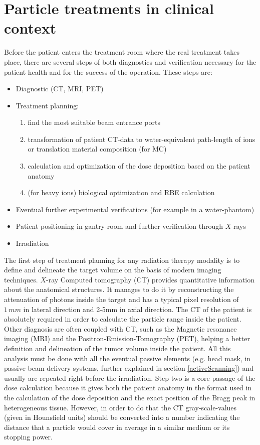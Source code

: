 \documentclass[12pt, a4paper, twoside]{book}
\begin{document}

\section{Particle treatments in clinical context}
Before the patient enters the treatment room where the real treatment takes place, there are several steps of both diagnostics and verification necessary for the patient health and for the success of the operation.
These steps are:
\begin{itemize}
\item Diagnostic (CT, MRI, PET)
\item Treatment planning:
	\begin{enumerate}
	\item find the most suitable beam entrance ports
	\item transformation of patient CT-data to water-equivalent path-length of ions or translation material composition (for MC)
	\item calculation and optimization of the dose deposition based on the patient anatomy
	\item (for heavy ions) biological optimization and RBE calculation
	\end{enumerate}
\item Eventual further experimental verifications (for example in a water-phantom)
\item Patient positioning in gantry-room and further verification through $X$-rays
\item Irradiation
\end{itemize}
The first step of treatment planning for any radiation therapy modality is to define and delineate the target volume on the basis of modern imaging techniques. $X$-ray Computed tomography (CT) provides quantitative information about the anatomical structures. It manages to do it by reconstructing the attenuation of photons inside the target and has a typical pixel resolution of $1\,mm$ in lateral direction and 2-5mm in axial direction. The CT of the patient is absolutely required in order to calculate the particle range inside the patient. Other diagnosis are often coupled with CT, such as the Magnetic resonance imaging (MRI) and the Positron-Emission-Tomography (PET), helping a better definition and delineation of the tumor volume inside the patient.
All this analysis must be done with all the eventual passive elements (e.g. head mask, in passive beam delivery systems, further explained in section \ref{activeScanning}) and usually are repeated right before the irradiation.
Step two is a core passage of the dose calculation because it gives both the patient anatomy in the format used in the calculation of the dose deposition and the exact position of the Bragg peak in heterogeneous tissue.
However, in order to do that the CT gray-scale-values (given in Hounsfield units) should be converted into a number indicating the distance that a particle would cover in average in a similar medium or its stopping power.
\end{document}
